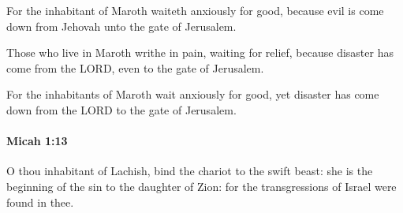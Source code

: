 			\begin{versebox}
					\item[BHS] 
					\item[LXX] 
					\item[ASV] For the inhabitant of Maroth waiteth anxiously for good, because evil is come down from Jehovah unto the gate of Jerusalem.
					\item[NIV] Those who live in Maroth writhe in pain, waiting for relief, because disaster has come from the LORD, even to the gate of Jerusalem.
					\item[NRSV] For the inhabitants of Maroth wait anxiously for good, yet disaster has come down from the LORD to the gate of Jerusalem.
			\end{versebox}

		\paragraph{Micah 1:13} %
			\label{MICAH-1-13}

			O thou inhabitant of Lachish, bind the chariot to the swift beast: she is the beginning of the sin to the daughter of Zion: for the transgressions of Israel were found in thee.

